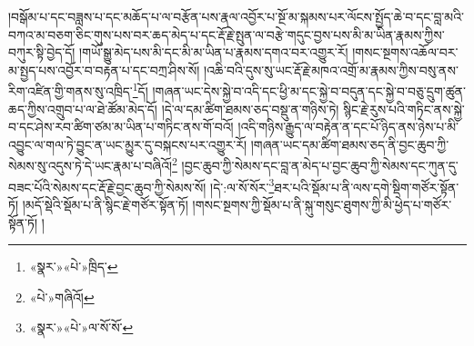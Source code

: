 །བསྒོམ་པ་དང་བཟླས་པ་དང་མཆོད་པ་ལ་བརྩོན་པས་རྣལ་འབྱོར་པ་སྔོ་མ་སྐམས་པར་ལོངས་སྤྱོད་ཆེ་བ་དང་བླ་མའི་བཀའ་མ་བཅག་ཅིང་གུས་པས་བར་ཆད་མེད་པ་དང་རྡོ་རྗེ་སྤུན་ལ་བརྩེ་གདུང་བྱས་པས་མི་མ་ཡིན་རྣམས་ཀྱིས་བཀུར་སྟི་བྱེད་དོ། །གཡོ་སྒྱུ་མེད་པས་མི་དང་མི་མ་ཡིན་པ་རྣམས་དགའ་བར་འགྱུར་རོ། །གསང་སྔགས་འཆོལ་བར་མ་སྤྱད་པས་འབྱོར་བ་བརྟན་པ་དང་བཀྲ་ཤིས་སོ། །འཆི་བའི་དུས་སུ་ཡང་རྡོ་རྗེ་མཁའ་འགྲོ་མ་རྣམས་ཀྱིས་བསུ་ནས་རིག་འཛིན་གྱི་གནས་སུ་འཁྲིད་\footnote{«སྣར་»«པེ་»ཁྲིད་}དོ། །གཞན་ཡང་དེས་སྐྱེ་བ་འདི་དང་ཕྱི་མ་དང་སྐྱེ་བ་བདུན་དང་སྐྱེ་བ་བཅུ་དྲུག་ཚུན་ཆད་ཀྱིས་འགྲུབ་པ་ལ་ཐེ་ཚོམ་མེད་དོ། །དེ་ལ་དམ་ཚིག་ཐམས་ཅད་བསྡུ་ན་གཉིས་ཏེ། སྙིང་རྗེ་རུས་པའི་གཏིང་ནས་སྐྱེ་བ་དང་ཤེས་རབ་ཚིག་ཙམ་མ་ཡིན་པ་གཏིང་ནས་གོ་བའོ། །འདི་གཉིས་རྒྱུད་ལ་བརྟེན་ན་དང་པོ་ཉིད་ནས་ཉེས་པ་མི་འབྱུང་ལ་གལ་ཏེ་བྱུང་ན་ཡང་མྱུར་དུ་བསྐངས་པར་འགྱུར་རོ། །གཞན་ཡང་དམ་ཚིག་ཐམས་ཅད་ནི་བྱང་ཆུབ་ཀྱི་སེམས་སུ་འདུས་ཏེ་དེ་ཡང་རྣམ་པ་བཞིའོ།\footnote{«པེ་»གཞིའོ།} །བྱང་ཆུབ་ཀྱི་སེམས་དང་བླ་ན་མེད་པ་བྱང་ཆུབ་ཀྱི་སེམས་དང་ཀུན་དུ་བཟང་པོའི་སེམས་དང་རྡོ་རྗེ་བྱང་ཆུབ་ཀྱི་སེམས་སོ། །དེ་:ལ་སོ་སོར་\footnote{«སྣར་»«པེ་»ལ་སོ་སོ་}ཐར་པའི་སྡོམ་པ་ནི་ལས་དགེ་སྡིག་གཙོར་སྟོན་ཏོ། །མདོ་སྡེའི་སྡོམ་པ་ནི་སྙིང་རྗེ་གཙོར་སྟོན་ཏོ། །གསང་སྔགས་ཀྱི་སྡོམ་པ་ནི་སྐུ་གསུང་ཐུགས་ཀྱི་མི་ཕྱེད་པ་གཙོར་སྟོན་ཏོ། །
